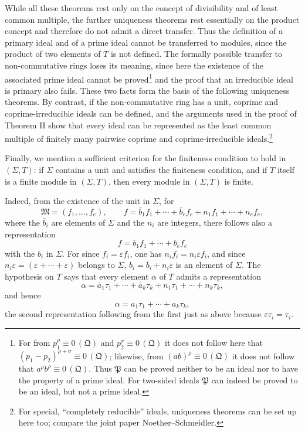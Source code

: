 \documentclass[11pt]{article}
\newcommand{\ideal}[1]{\mathfrak{#1}}
\newcommand{\eqzero}[1]{\equiv 0\,(#1)}
\begin{document}
While all these theorems rest only on the concept of divisibility and of least common multiple, the further uniqueness theorems rest essentially on the product concept and therefore do not admit a direct transfer. Thus the definition of a primary ideal and of a prime ideal cannot be transferred to modules, since the product of two elements of $T$ is not defined. The formally possible transfer to non-commutative rings loses its meaning, since here the existence of the associated prime ideal cannot be proved\footnote{For from $p_1^\rho\eqzero{\ideal Q}$ and $p_2^\sigma\eqzero{\ideal Q}$ it does not follow here that $(p_1-p_2)^{\rho+\sigma}\eqzero{\ideal Q}$; likewise, from $(ab)^\rho\eqzero{\ideal Q}$ it does not follow that $a^\rho b^\rho\eqzero{\ideal Q}$. Thus $\ideal P$ can be proved neither to be an ideal nor to have the property of a prime ideal. For two-sided ideals $\ideal P$ can indeed be proved to be an ideal, but not a prime ideal.} and the proof that an irreducible ideal is primary also fails. These two facts form the basis of the following uniqueness theorems. By contrast, if the non-commutative ring has a unit, coprime and coprime-irreducible ideals can be defined, and the arguments used in the proof of Theorem II show that every ideal can be represented as the least common multiple of finitely many pairwise coprime and coprime-irreducible ideals.\footnote{For special, ``completely reducible'' ideals, uniqueness theorems can be set up here too; compare the joint paper Noether--Schmeidler.}

Finally, we mention a sufficient criterion for the finiteness condition to hold in $(\Sigma,T)$: if $\Sigma$ contains a unit and satisfies the finiteness condition, and if $T$ itself is a finite module in $(\Sigma,T)$, then every module in $(\Sigma,T)$ is finite.

Indeed, from the existence of the unit in $\Sigma$, for
\[
 \ideal M=(f_1,
\ldots,f_e),
 \qquad
 f=\bar b_1f_1+\cdots+\bar b_ef_e+n_1f_1+\cdots+n_ef_e,
\]
where the $\bar b_i$ are elements of $\Sigma$ and the $n_i$ are integers, there follows also a representation
\[
 f=b_1f_1+\cdots+b_ef_e
\]
with the $b_i$ in $\Sigma$. For since $f_i=\varepsilon f_i$, one has $n_if_i=n_i\varepsilon f_i$, and since $n_i\varepsilon=(\varepsilon+\cdots+\varepsilon)$ belongs to $\Sigma$, $b_i=\bar b_i+n_i\varepsilon$ is an element of $\Sigma$. The hypothesis on $T$ says that every element $\alpha$ of $T$ admits a representation
\[
 \alpha=\bar a_1\tau_1+\cdots+\bar a_k\tau_k+n_1\tau_1+\cdots+n_k\tau_k,
\]
and hence
\[
 \alpha=a_1\tau_1+\cdots+a_k\tau_k,
\]
the second representation following from the first just as above because $\varepsilon\tau_i=\tau_i$.
\end{document}

